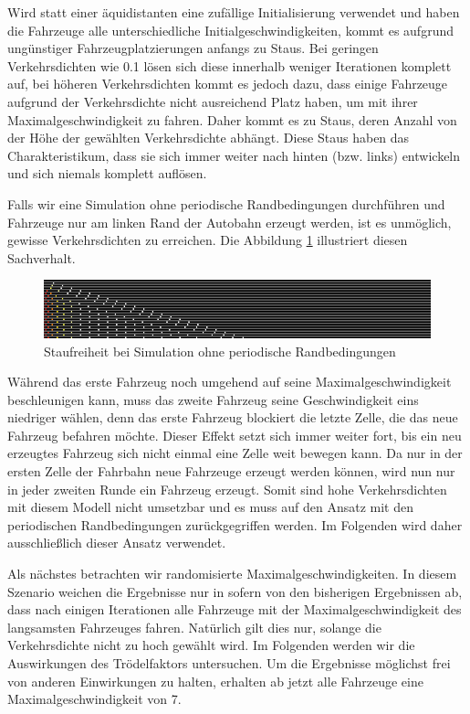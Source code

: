 \documentclass[10pt, a4paper]{article}
\begin{document}
Wird statt einer äquidistanten eine zufällige Initialisierung verwendet und haben die Fahrzeuge alle unterschiedliche Initialgeschwindigkeiten, kommt es aufgrund ungünstiger Fahrzeugplatzierungen anfangs zu Staus. Bei geringen Verkehrsdichten wie 0.1 lösen sich diese innerhalb weniger Iterationen komplett auf, bei höheren Verkehrsdichten kommt es jedoch dazu, dass einige Fahrzeuge aufgrund der Verkehrsdichte nicht ausreichend Platz haben, um mit ihrer Maximalgeschwindigkeit zu fahren. Daher kommt es zu Staus, deren Anzahl von der Höhe der gewählten Verkehrsdichte abhängt. Diese Staus haben das Charakteristikum, dass sie sich immer weiter nach hinten (bzw. links) entwickeln und sich niemals komplett auflösen.

Falls wir eine Simulation ohne periodische Randbedingungen durchführen und Fahrzeuge nur am linken Rand der Autobahn erzeugt werden, ist es unmöglich, gewisse Verkehrsdichten zu erreichen. Die Abbildung \ref{fig:ergEinspurigKeinWraparoundKeinStau} illustriert diesen Sachverhalt.

\begin{figure}[h!]
	\centering
	\includegraphics[width=\textwidth]{img/erg_einspurig_kein_wraparound_dichte_0_5}
	\caption{Staufreiheit bei Simulation ohne periodische Randbedingungen}
	\label{fig:ergEinspurigKeinWraparoundKeinStau}
\end{figure}

Während das erste Fahrzeug noch umgehend auf seine Maximalgeschwindigkeit beschleunigen kann, muss das zweite Fahrzeug seine Geschwindigkeit eins niedriger wählen, denn das erste Fahrzeug blockiert die letzte Zelle, die das neue Fahrzeug befahren möchte. Dieser Effekt setzt sich immer weiter fort, bis ein neu erzeugtes Fahrzeug sich nicht einmal eine Zelle weit bewegen kann. Da nur in der ersten Zelle der Fahrbahn neue Fahrzeuge erzeugt werden können, wird nun nur in jeder zweiten Runde ein Fahrzeug erzeugt. Somit sind hohe Verkehrsdichten mit diesem Modell nicht umsetzbar und es muss auf den Ansatz mit den periodischen Randbedingungen zurückgegriffen werden. Im Folgenden wird daher ausschließlich dieser Ansatz verwendet.

Als nächstes betrachten wir randomisierte Maximalgeschwindigkeiten. In diesem Szenario weichen die Ergebnisse nur in sofern von den bisherigen Ergebnissen ab, dass nach einigen Iterationen alle Fahrzeuge mit der Maximalgeschwindigkeit des langsamsten Fahrzeuges fahren. Natürlich gilt dies nur, solange die Verkehrsdichte nicht zu hoch gewählt wird. Im Folgenden werden wir die Auswirkungen des Trödelfaktors untersuchen. Um die Ergebnisse möglichst frei von anderen Einwirkungen zu halten, erhalten ab jetzt alle Fahrzeuge eine Maximalgeschwindigkeit von 7.
\end{document}
